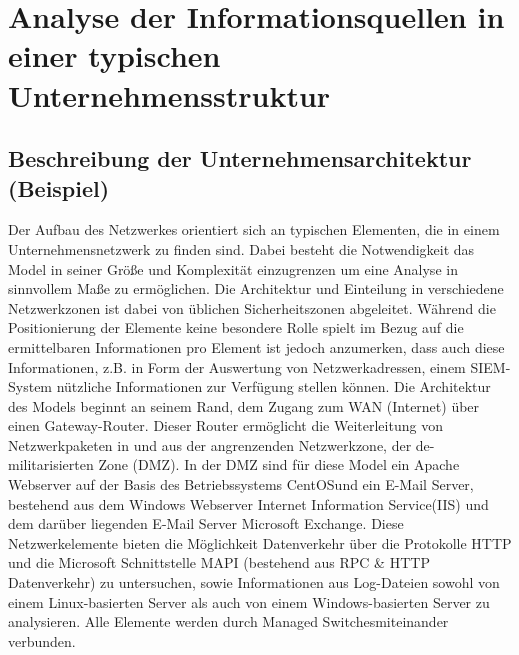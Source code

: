 \chapter{Analyse der Informationsquellen in einer typischen Unternehmensstruktur}
\label{cha:Analyse der Informationsquellen in einer typischen Unternehmensstruktur}


\section{Beschreibung der Unternehmensarchitektur (Beispiel)}




Der Aufbau des Netzwerkes orientiert sich an typischen Elementen, die in einem Unternehmensnetzwerk zu finden sind. Dabei besteht die Notwendigkeit das Model in seiner Größe und Komplexität einzugrenzen um eine Analyse in sinnvollem Maße zu ermöglichen. 
Die Architektur und Einteilung in verschiedene Netzwerkzonen ist dabei von üblichen Sicherheitszonen abgeleitet. Während die Positionierung der Elemente keine besondere Rolle spielt im Bezug auf die ermittelbaren Informationen pro Element ist jedoch anzumerken, dass auch diese Informationen, z.B. in Form der Auswertung von Netzwerkadressen, einem SIEM-System nützliche Informationen zur Verfügung stellen können. Die Architektur des Models beginnt an seinem \glqq Rand\grqq, dem Zugang zum WAN (Internet) über einen Gateway-Router. Dieser Router ermöglicht die Weiterleitung von Netzwerkpaketen in und aus der angrenzenden Netzwerkzone, der de-militarisierten Zone (DMZ). 
In der DMZ sind für diese Model ein Apache Webserver auf der Basis des Betriebssystems \glqq CentOS\grqq und ein E-Mail Server, bestehend aus dem Windows Webserver \glqq Internet Information Service\grqq (IIS) und dem darüber liegenden E-Mail Server \glqq Microsoft Exchange\grqq. Diese Netzwerkelemente bieten die Möglichkeit Datenverkehr über die Protokolle HTTP und die Microsoft Schnittstelle MAPI (bestehend aus RPC \& HTTP Datenverkehr) zu untersuchen, sowie Informationen aus Log-Dateien sowohl von einem Linux-basierten Server als auch von einem Windows-basierten Server zu analysieren. Alle Elemente werden durch \glqq Managed Switches\grqq miteinander verbunden.

